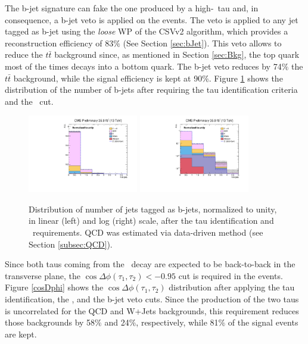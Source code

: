 \noindent The b-jet signature can fake the one produced by a high-\pt~tau and, in consequence,
a b-jet veto is applied on the events. The veto is applied to any jet
tagged as b-jet using the \textit{loose} WP of the CSVv2 algorithm, which provides 
a reconstruction efficiency of 83$\%$ (See Section \ref{sec:bJet}). This veto allows to reduce 
the $t\bar{t}$ background since, as mentioned in Section \ref{sec:Bkg}, 
the top quark most of the times decays into a bottom quark. The b-jet veto
reduces by 74$\%$ the $t\bar{t}$ background, while the signal efficiency 
is kept at 90$\%$. Figure \ref{bjet} shows the distribution of the number of b-jets 
after requiring the tau identification criteria and the \MET~cut.\\

  \begin{figure}[H]
 \begin{center}
 \captionsetup[subfloat]{farskip=0pt,captionskip=0.0cm,labelformat=empty}
 \includegraphics[clip,width=0.43\textwidth]{figuras/Chapter5/TauID_Plots/NBJets.pdf}
 \includegraphics[clip,width=0.43\textwidth]{figuras/Chapter5/TauID_Plots/NBJets_log.pdf}
 \end{center}
 \caption{Distribution of number of jets tagged as b-jets, normalized to unity, in linear (left) and log (right) scale, after 
 the tau identification and \MET~requirements. QCD was estimated  via data-driven method (see Section \ref{subsec:QCD}).}
 \label{bjet}
 \end{figure}

 \noindent Since both taus coming from the \Zprime~decay are expected to be back-to-back
 in the transverse plane, the $\cos\Delta \phi (\tau_{1},\tau_{2}) < -0.95$ cut is required in 
 the events. Figure \ref{cosDphi} shows the $\cos\Delta \phi (\tau_{1},\tau_{2})$ distribution after applying
 the tau identification, the \MET, and the b-jet veto cuts. Since the production of the 
 two taus is uncorrelated for the QCD and W+Jets backgrounds, this requirement
 reduces those backgrounds by 58$\%$ and 24$\%$, respectively, while 
 81$\%$ of the signal events are kept. \\
 
